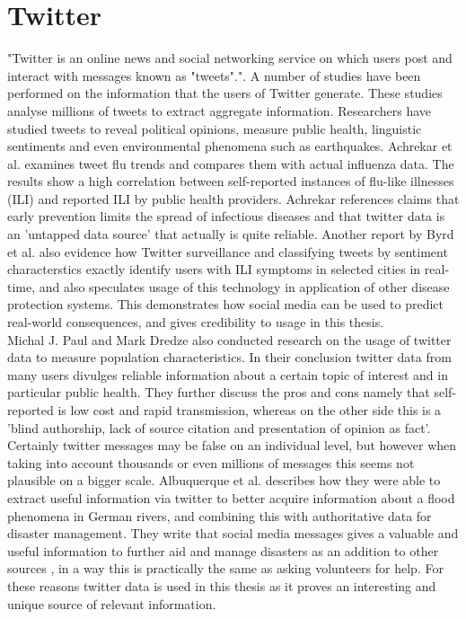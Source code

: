 \section{Twitter}
"Twitter is an online news and social networking service on which users post and interact with messages known as "tweets"."\cite{twitter_twitter}. A number of studies have been performed on the information that the users of Twitter generate. These studies analyse millions of tweets to extract aggregate information. Researchers have studied tweets to reveal political opinions\cite{twitter_politic}, measure public health\cite{twitter_flu_trends}, linguistic sentiments\cite{twitter_linguistics} and even environmental phenomena such as earthquakes\cite{twitter_earthQuake}. Achrekar et al.\cite{twitter_flu_trends} examines tweet flu trends and compares them with actual influenza data. The results show a high correlation between self-reported instances of flu-like illnesses (ILI) and reported ILI by public health providers. Achrekar references claims that early prevention limits the spread of infectious diseases and that twitter data is an 'untapped data source' that actually is quite reliable. Another report by Byrd et al.\cite{byrd2016mining} also evidence how Twitter surveillance and classifying tweets by sentiment characterstics exactly identify users with ILI symptoms in selected cities in real-time, and also speculates usage of this technology in application of other disease protection systems. This demonstrates how social media can be  used to predict real-world consequences, and gives credibility to usage in this thesis. \\Michal J. Paul and Mark Dredze \cite{twitter_what_you_tweet} also conducted research on the usage of twitter data to measure population characteristics. In their conclusion twitter data from many users divulges reliable information about a certain topic of interest and in particular public health. They further discuss the pros and cons namely that self-reported is low cost and rapid transmission, whereas on the other side this is a 'blind authorship, lack of source citation and presentation of opinion as fact'. Certainly twitter messages may be false on an individual level, but however when taking into account thousands or even millions of messages this seems not plausible on a bigger scale. Albuquerque et al. \cite{de2015geographic} describes how they were able to extract useful information via twitter to better acquire information about a flood phenomena in German rivers, and combining this with authoritative data for disaster management. They write that social media messages gives a valuable and useful information to further aid and manage disasters as an addition to other sources , in a way this is practically the same as asking volunteers for help. For these reasons twitter data is used in this thesis as it proves an interesting and unique source of relevant information.





